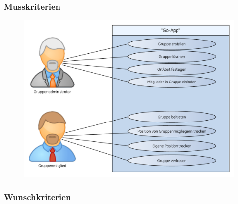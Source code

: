 \subsubsection{Musskriterien}
\begin{figure} [H]
	\centering
	\includegraphics[scale=0.8, trim=2cm 0 0 0cm]{res/anwendungsfall.pdf}
\end{figure}

\subsubsection{Wunschkriterien}
